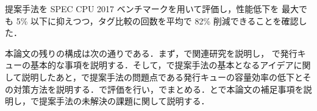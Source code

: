 提案手法を SPEC CPU 2017 ベンチマークを用いて評価し，性能低下を 最大でも 5\% 以下に抑えつつ，タグ比較の回数を平均で 82\% 削減できることを確認した．

本論文の残りの構成は次の通りである．まず，で関連研究を説明し， で発行キューの基本的な事項を説明する．そして，で提案手法の基本となるアイデアに関して説明したあと，で提案手法の問題点である発行キューの容量効率の低下とその対策方法を説明する．で評価を行い，でまとめる．とで本論文の補足事項を説明し，で提案手法の未解決の課題に関して説明する．

